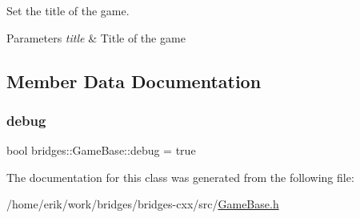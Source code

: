 Set the title of the game. 


\begin{DoxyParams}{Parameters}
{\em title} & Title of the game \\
\hline
\end{DoxyParams}


\subsection{Member Data Documentation}
\mbox{\label{classbridges_1_1_game_base_a5db5d0838bee9722fc90465166c55d26}} 
\subsubsection{\texorpdfstring{debug}{debug}}
{\footnotesize\ttfamily bool bridges\+::\+Game\+Base\+::debug = true\hspace{0.3cm}{\ttfamily [protected]}}



The documentation for this class was generated from the following file\+:\begin{DoxyCompactItemize}
\item 
/home/erik/work/bridges/bridges-\/cxx/src/\hyperlink{_game_base_8h}{Game\+Base.\+h}\end{DoxyCompactItemize}
